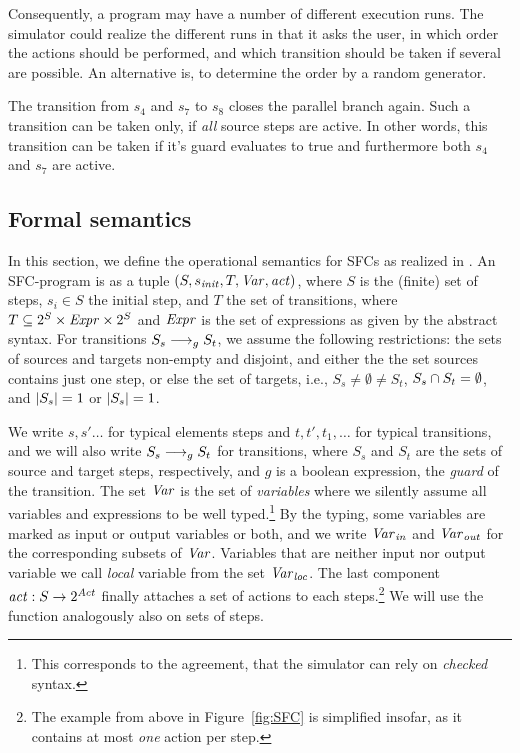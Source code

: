 Consequently, a program may have a number of different execution runs.  The
simulator could realize the different runs in that it asks the user, in which
order the actions should be performed, and which transition should be taken if
several are possible.  An alternative is, to determine the order by a random
generator.

The transition from $s_4$ and $s_7$ to $s_8$ closes the parallel branch again.
Such a transition can be taken only, if \emph{all} source steps are active. In
other words, this transition can be taken if it's guard evaluates to true and
furthermore both $s_4$ and $s_7$ are active.



\subsection{Formal semantics}
\label{sec:semantics.formal}

In this section, we define the operational semantics for SFCs as realized
in \Slime. An SFC-program is as a tuple $(S,s_{\mathit{init}},T,\mathit{Var},\mathit{act})$, where
$S$ is the (finite) set of steps, $s_i \in S$ the initial step, and $T$ the
set of transitions, where $T \subseteq 2^S \times \mathit{Expr} \times 2^S$ and
$\mathit{Expr}$ is the set of expressions as given by the abstract syntax. For
transitions $S_s \longrightarrow_{g} S_t$, we assume the following restrictions: the
sets of sources and targets non-empty and disjoint, and either the the set
sources contains just one step, or else the set of targets, i.e., $S_s
\not= \emptyset \not= S_t$, $S_s \cap S_t = \emptyset$, and
${\mid}{S_s}{\mid} = 1$ or ${\mid}{S_s}{\mid} = 1$.

We write $s, s' \ldots$ for typical elements steps and $t,t', t_1, \ldots$
for typical transitions, and we will also write $S_s \longrightarrow_{g} S_t$ for
transitions, where $S_s$ and $S_t$ are the sets of source and target steps,
respectively, and $g$ is a boolean expression, the \emph{guard} of the
transition. The set $\mathit{Var}$ is the set of \emph{variables} where we silently
assume all variables and expressions to be well typed.\footnote{This
  corresponds to the agreement, that the simulator can rely on
  \emph{checked} syntax.}  By the typing, some variables are marked as
input or output variables or both, and we write $\mathit{Var}_{\mathit{in}}$ and $\mathit{Var}_{\mathit{out}}$ for
the corresponding subsets of $\mathit{Var}$.  Variables that are neither input nor
output variable we call \emph{local} variable from the set $\mathit{Var}_{\mathit{loc}}$.  The
last component $\mathit{act} \mathrel{:} S \to 2^{\mathit{Act}}$ finally attaches a set of actions to
each steps.\footnote{The example from above in Figure~\ref{fig:SFC} is
  simplified insofar, as it contains at most \emph{one} action per step.}
We will use the function analogously also on sets of steps.


